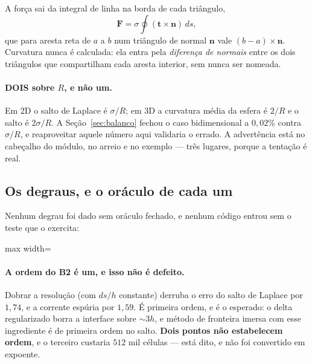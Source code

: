 A for\c{c}a sai da integral de linha na borda de cada tri\^angulo,
\begin{equation}
  \mathbf{F} = \sigma \oint (\mathbf{t}\times\mathbf{n})\, ds ,
  \label{eq:tensao3d}
\end{equation}
que para aresta reta de $a$ a $b$ num tri\^angulo de normal $\mathbf{n}$ vale
$(b-a)\times\mathbf{n}$. Curvatura nunca \'e calculada: ela entra pela
\emph{diferen\c{c}a de normais} entre os dois tri\^angulos que compartilham cada
aresta interior, sem nunca ser nomeada.

\paragraph{DOIS sobre $R$, e n\~ao um.} Em 2D o salto de Laplace \'e $\sigma/R$;
em 3D a curvatura m\'edia da esfera \'e $2/R$ e o salto \'e $2\sigma/R$. A
Se\c{c}\~ao~\ref{sec:balanco} fechou o caso bidimensional a $0{,}02\%$ contra
$\sigma/R$, e reaproveitar aquele n\'umero aqui validaria o errado. A
advert\^encia est\'a no cabe\c{c}alho do m\'odulo, no arreio e no exemplo ---
tr\^es lugares, porque a tenta\c{c}\~ao \'e real.

\subsection{Os degraus, e o or\'aculo de cada um}

Nenhum degrau foi dado sem or\'aculo fechado, e nenhum c\'odigo entrou sem o
teste que o exercita:

\begin{adjustbox}{max width=\linewidth}
\end{adjustbox}

\paragraph{A ordem do B2 \'e um, e isso n\~ao \'e defeito.} Dobrar a
resolu\c{c}\~ao (com $ds/h$ constante) derruba o erro do salto de Laplace por
$1{,}74$, e a corrente esp\'uria por $1{,}59$. \'E primeira ordem, e \'e o
esperado: o delta regularizado borra a interface sobre $\sim 3h$, e m\'etodo de
fronteira imersa com esse ingrediente \'e de primeira ordem no salto.
\textbf{Dois pontos n\~ao estabelecem ordem}, e o terceiro custaria $512$ mil
c\'elulas --- est\'a dito, e n\~ao foi convertido em expoente.

